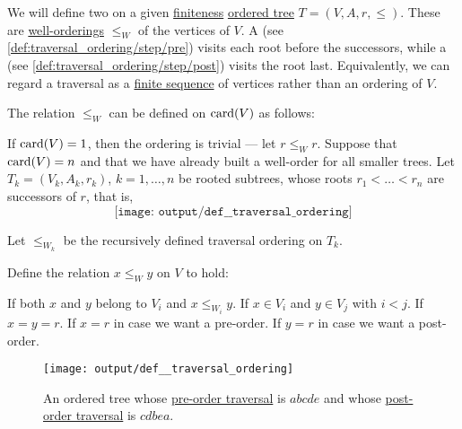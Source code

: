 \begin{definition}\label{def:traversal_ordering}
  We will define two  on a given \hyperref[def:set_finiteness]{finiteness} \hyperref[def:ordered_tree]{ordered tree} \( T = (V, A, r, \leq) \). These are \hyperref[def:well_ordered_set]{well-orderings} \( \leq_W \) of the vertices of \( V \). A  (see \ref{def:traversal_ordering/step/pre}) visits each root before the successors, while a  (see \ref{def:traversal_ordering/step/post}) visits the root last. Equivalently, we can regard a traversal as a \hyperref[def:sequence]{finite sequence} of vertices rather than an ordering of \( V \).

  The relation \( \leq_W \) can be defined on \( \operatorname{card}(V) \) as follows:
  \begin{thmenum}
     If \( \operatorname{card}(V) = 1 \), then the ordering is trivial --- let \( r \leq_W r \).
     Suppose that \( \operatorname{card}(V) = n \) and that we have already built a well-order for all smaller trees. Let \( T_k = (V_k, A_k, r_k) \), \( k = 1, \ldots, n \) be rooted subtrees, whose roots \( r_1 < \ldots < r_n \) are successors of \( r \), that is,
    \begin{equation*}
      \texttt{[image: output/def\_\_traversal\_ordering]}
    \end{equation*}

    Let \( \leq_{W_k} \) be the recursively defined traversal ordering on \( T_k \).

    Define the relation \( x \leq_W y \) on \( V \) to hold:
    \begin{thmenum}
       If both \( x \) and \( y \) belong to \( V_i \) and \( x \leq_{W_i} y \).
       If \( x \in V_i \) and \( y \in V_j \) with \( i < j \).
       If \( x = y = r \).
       If \( x = r \) in case we want a pre-order.
       If \( y = r \) in case we want a post-order.
    \end{thmenum}
  \end{thmenum}

  \begin{figure}[!ht]
    \centering
    \texttt{[image: output/def\_\_traversal\_ordering]}
    \caption{An ordered tree whose \hyperref[def:traversal_ordering]{pre-order traversal} is \( abcde \) and whose \hyperref[def:traversal_ordering]{post-order traversal} is \( cdbea \).}
    \label{fig:def:traversal_ordering}
  \end{figure}
\end{definition}
